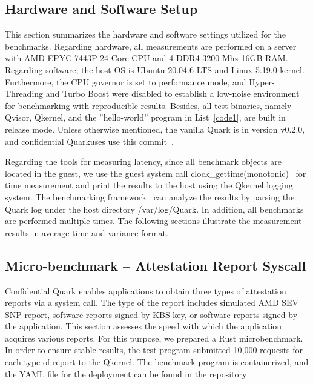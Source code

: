 
\subsection{Hardware and Software Setup}\label{Hardware_and_Software_Setup}

This section summarizes the hardware and software settings utilized for the benchmarks. Regarding hardware, all measurements are performed on a server with AMD EPYC 7443P 24-Core CPU and 4 DDR4-3200 Mhz-16GB RAM. Regarding software, the host OS is Ubuntu 20.04.6 LTS and Linux 5.19.0 kernel. 
Furthermore, the CPU governor is set to performance mode, and Hyper-Threading and Turbo Boost were disabled to establish a low-noise environment for benchmarking with reproducible results. Besides, all test binaries, namely Qvisor, Qkernel, and the ”hello-world” program in List~\ref{code1}, are built in 
release mode. Unless otherwise mentioned, the vanilla Quark is in version v0.2.0, and confidential Quarkuses use this commit~\cite*{qualitativ_confidentail_quark}.


Regarding the tools for measuring latency, since all benchmark objects are located in the guest, we use the guest system call clock\_gettime(monotonic)~\cite*{clock_gettime} for time measurement and print the results to the host using the Qkernel logging system. The 
benchmarking framework~\cite*{benchamark_framework} can analyze the results by parsing the Quark log under the host directory /var/log/Quark. In addition, all benchmarks are performed multiple times. The following sections illustrate the measurement results in average time and variance format.



\subsection{Micro-benchmark – Attestation Report Syscall}\label{Attestation_Report_Syscall}

Confidential Quark enables applications to obtain three types of attestation reports via a system call. The type of the report includes simulated AMD SEV SNP report, software reports signed by KBS key, or software reports signed by the application. This section assesses the speed with which the 
application acquires various reports. For this purpose, we prepared a Rust microbenchmark\cite*{benchamark_Attestation_Report_Syscall}. In order to ensure stable results, the test program submitted 10,000 requests for each type of report to the Qkernel. The benchmark program is containerized, 
and the YAML file for the deployment can be found in the repository~\cite*{perf_test_repo}.

